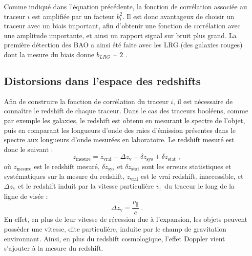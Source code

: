 Comme indiqué dans l'équation précédente, la fonction de corrélation associée au traceur $i$ est amplifiée par un facteur $b_{i}^2$.
Il est donc avantageux de choisir un traceur avec un biais important, afin d'obtenir une fonction de corrélation avec une amplitude importante, et ainsi un rapport signal sur bruit plus grand. La première détection des BAO a ainsi été faite avec les LRG (des galaxies rouges) dont la mesure du biais donne $b_{LRG} \sim 2$ \autocite{Eisenstein2005}.

\subsection{Distorsions dans l'espace des redshifts}
\label{subsec:intro_rsd}
Afin de construire la fonction de corrélation du traceur $i$, il est nécessaire de connaître le redshift de chaque traceur. Dans le cas des traceurs booléens, comme par exemple les galaxies, le redshift est obtenu en mesurant le spectre de l'objet, puis en comparant les longueurs d'onde des raies d'émission présentes dans le spectre aux longueurs d'onde mesurées en laboratoire. Le redshift mesuré est donc le suivant :
\begin{equation}
  z_{\mathrm{mesure}} = z_{\mathrm{vrai}} + \Delta z_{\mathrm{v}} + \delta z_{\mathrm{sys}} + \delta z_{\mathrm{stat}}  \; ,
\end{equation}
où $z_{\mathrm{mesure}}$ est le redshift mesuré, $\delta z_{\mathrm{sys}}$ et $\delta z_{\mathrm{stat}}$ sont les erreurs statistiques et systématiques sur la mesure du redshift, $z_{\mathrm{vrai}}$ est le vrai redshift, inaccessible,
et $\Delta z_{\mathrm{v}}$ et le redshift induit par la vitesse particulière $v_{\parallel}$ du traceur le long de la ligne de visée :
\begin{equation}
  \label{eq:delta_z}
  \Delta z_{\mathrm{v}} = \frac{v_{\parallel}}{c} \; .
\end{equation}
En effet, en plus de leur vitesse de récession due à l'expansion, les objets peuvent posséder une vitesse, dite particulière, induite par le champ de gravitation environnant. 
Ainsi, en plus du redshift cosmologique, l'effet Doppler vient s'ajouter à la mesure du redshift.
